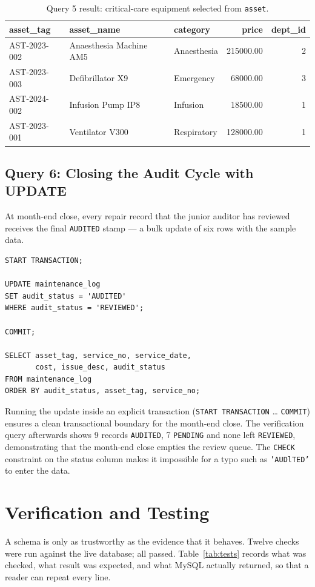 \documentclass[conference]{IEEEtran}
\begin{document}
\begin{table}[!t]
  \caption{Query 5 result: critical-care equipment selected from \texttt{asset}.}
  \label{tab:q5}
  \centering
  \footnotesize
  \begin{tabular}{lllrr}
    \toprule
    asset\_tag & asset\_name & category & price & dept\_id \\
    \midrule
    AST-2023-002 & Anaesthesia Machine AM5 & Anaesthesia & 215000.00 & 2 \\
    AST-2023-003 & Defibrillator X9 & Emergency & 68000.00 & 3 \\
    AST-2024-002 & Infusion Pump IP8 & Infusion & 18500.00 & 1 \\
    AST-2023-001 & Ventilator V300 & Respiratory & 128000.00 & 1 \\
    \bottomrule
  \end{tabular}
\end{table}

\subsection{Query 6: Closing the Audit Cycle with UPDATE}\label{sec:q6}
At month-end close, every repair record that the junior auditor has reviewed
receives the final \texttt{AUDITED} stamp --- a bulk update of six rows with
the sample data.

\begin{lstlisting}[style=sqlstyle]
START TRANSACTION;

UPDATE maintenance_log
SET audit_status = 'AUDITED'
WHERE audit_status = 'REVIEWED';

COMMIT;

SELECT asset_tag, service_no, service_date,
       cost, issue_desc, audit_status
FROM maintenance_log
ORDER BY audit_status, asset_tag, service_no;
\end{lstlisting}

Running the update inside an explicit transaction (\texttt{START TRANSACTION}
\dots{} \texttt{COMMIT}) ensures a clean transactional boundary for the
month-end close. The verification
query afterwards shows 9 records \texttt{AUDITED}, 7 \texttt{PENDING} and
none left \texttt{REVIEWED}, demonstrating that the month-end close empties
the review queue. The \texttt{CHECK} constraint on
the status column makes it impossible for a typo such as
\texttt{'AUDlTED'} to enter the data.

\section{Verification and Testing}
A schema is only as trustworthy as the evidence that it behaves. Twelve
checks were run against the live database; all passed. Table~\ref{tab:tests}
records what was checked, what result was expected, and what MySQL actually
returned, so that a reader can repeat every line.
\end{document}
